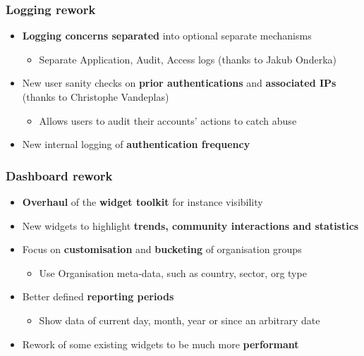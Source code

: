 \begin{frame}
  \frametitle{Logging rework}
  \begin{itemize}
     \item {\bf Logging concerns separated} into optional separate mechanisms
     \begin{itemize}
         \item Separate Application, Audit, Access logs (thanks to Jakub Onderka)
     \end{itemize}
     \item New user sanity checks on {\bf prior authentications} and {\bf associated IPs} (thanks to Christophe Vandeplas)
     \begin{itemize}
         \item Allows users to audit their accounts' actions to catch abuse
     \end{itemize}
     \item New internal logging of {\bf authentication frequency}
  \end{itemize}
\end{frame}

\begin{frame}
  \frametitle{Dashboard rework}
  \begin{itemize}
     \item {\bf Overhaul} of the {\bf widget toolkit} for instance visibility
     \item New widgets to highlight {\bf trends, community interactions and statistics}
     \item Focus on {\bf customisation} and {\bf bucketing} of organisation groups
     \begin{itemize}
         \item Use Organisation meta-data, such as country, sector, org type
     \end{itemize}
     \item Better defined {\bf reporting periods}
     \begin{itemize}
         \item Show data of current day, month, year or since an arbitrary date
     \end{itemize}
     \item Rework of some existing widgets to be much more {\bf performant}
  \end{itemize}
\end{frame}

